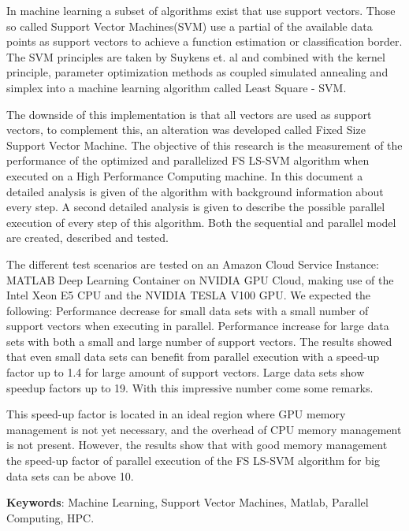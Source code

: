 In machine learning a subset of algorithms exist that use support vectors.
Those so called Support Vector Machines(SVM) use a partial of the available data points as support vectors to achieve a function estimation or classification border.
The SVM principles are taken by Suykens et. al and combined with the kernel principle, parameter optimization methods as coupled simulated annealing and simplex into a machine learning algorithm called Least Square - SVM.
\par 
The downside of this implementation is that all vectors are used as support vectors, to complement this, an alteration was developed called Fixed Size Support Vector Machine.
The objective of this research is the measurement of the performance of the optimized and parallelized FS LS-SVM algorithm when executed on a High Performance Computing machine.
In this document a detailed analysis is given of the algorithm with background information about every step.
A second detailed analysis is given to describe the possible parallel execution of every step of this algorithm. 
Both the sequential and parallel model are created, described and tested.
\par 
The different test scenarios are tested on an Amazon Cloud Service Instance: MATLAB Deep Learning Container on NVIDIA GPU Cloud, making use of the Intel Xeon E5 CPU and the NVIDIA TESLA V100 GPU. 
We expected the following:
Performance decrease for small data sets with a small number of support vectors when executing in parallel.
Performance increase for large data sets with both a small and large number of support vectors.
The results showed that even small data sets can benefit from parallel execution with a speed-up factor up to 1.4 for large amount of support vectors.
Large data sets show speedup factors up to 19. 
With this impressive number come some remarks.
\par 
This speed-up factor is located in an ideal region where GPU memory management is not yet necessary, and the overhead of CPU memory management is not present. 
However, the results show that with good memory management the speed-up factor of parallel execution of the FS LS-SVM algorithm for big data sets can be above 10.


\textbf{Keywords}: Machine Learning, Support Vector Machines, Matlab, Parallel Computing, HPC. 
